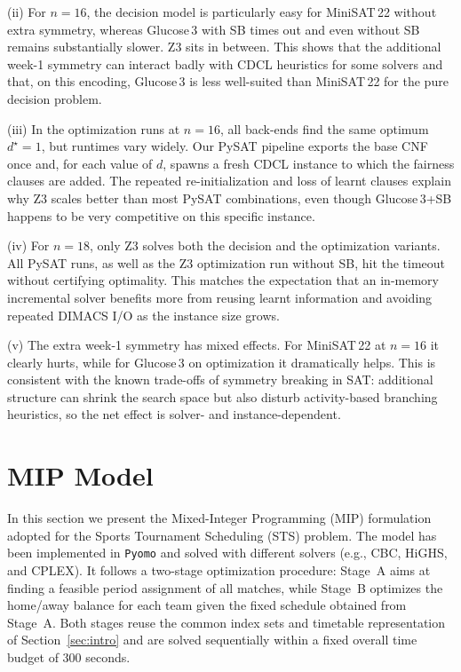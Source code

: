 \documentclass{article}
\begin{document}
(ii) For $n=16$, the decision model is particularly easy for MiniSAT\,22 without
extra symmetry, whereas Glucose\,3 with SB times out and even
without SB remains substantially slower. Z3 sits in between. 
This shows that the additional week-1 symmetry can interact
badly with CDCL heuristics for some solvers and that, on this encoding,
Glucose\,3 is less well-suited than MiniSAT\,22 for the pure decision problem.

(iii) In the optimization runs at $n=16$, all back-ends find the same optimum
$d^\star = 1$, but runtimes vary widely. Our PySAT pipeline
exports the base CNF once and, for each value of $d$, spawns a fresh CDCL
instance to which the fairness clauses are added.
The repeated re-initialization and loss of learnt clauses explain why Z3 scales
better than most PySAT combinations, even though Glucose\,3+SB happens to be
very competitive on this specific instance.

(iv) For $n=18$, only Z3 solves both the decision and the optimization variants.
All PySAT runs, as well as the Z3 optimization run
without SB, hit the timeout without certifying optimality. This matches the
expectation that an in-memory incremental solver benefits more from reusing
learnt information and avoiding repeated DIMACS I/O as the instance size grows.

(v) The extra week-1 symmetry has mixed effects. For MiniSAT\,22 at $n=16$ it
clearly hurts, while for Glucose\,3 on optimization it dramatically helps.
This is consistent with the known trade-offs of symmetry breaking in SAT: 
additional structure can shrink the search space but
also disturb activity-based branching heuristics, so the net effect is
solver- and instance-dependent.

\section{MIP Model}

In this section we present the Mixed-Integer Programming (MIP) formulation
adopted for the Sports Tournament Scheduling (STS) problem. The model has been
implemented in \texttt{Pyomo} and solved with different solvers (e.g., CBC,
HiGHS, and CPLEX). It follows a two-stage optimization procedure: Stage~A aims
at finding a feasible period assignment of all matches, while Stage~B optimizes
the home/away balance for each team given the fixed schedule obtained from
Stage~A. Both stages reuse the common index sets and timetable representation
of Section~\ref{sec:intro} and are solved sequentially within a fixed overall
time budget of 300 seconds.
\end{document}
